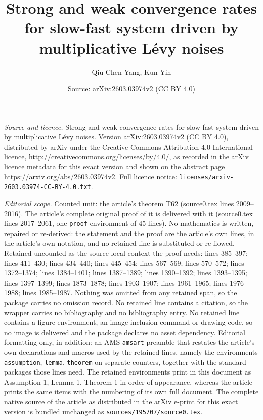 \documentclass[10pt,a4paper]{amsart}
\title{Strong and weak convergence rates for slow-fast system driven by multiplicative L\'{e}vy noises}
\author{Qiu-Chen Yang, Kun Yin}
\date{Source: arXiv:2603.03974v2 (CC BY 4.0)}
\begin{document}
\maketitle

\noindent\emph{Source and licence.} Strong and weak convergence rates for slow-fast system driven by multiplicative L\'{e}vy noises. Version arXiv:2603.03974v2 (CC BY 4.0), distributed by arXiv under the Creative Commons Attribution 4.0 International licence, http://creativecommons.org/licenses/by/4.0/, as recorded in the arXiv licence metadata for this exact version and shown on the abstract page https://arxiv.org/abs/2603.03974v2. Full licence notice: \texttt{licenses/arxiv-2603.03974-CC-BY-4.0.txt}.\par\smallskip

\noindent\textit{Editorial scope.} Counted unit: the article's theorem T62 (source0.tex lines 2009--2016). The article's complete original proof of it is delivered with it (source0.tex lines 2017--2061, one \texttt{proof} environment of 45 lines). No mathematics is written, repaired or re-derived: the statement and the proof are the article's own lines, in the article's own notation, and no retained line is substituted or re-flowed.  Retained uncounted as the source-local context the proof needs: lines 385--397; lines 411--430; lines 434--440; lines 445--454; lines 567--569; lines 570--572; lines 1372--1374; lines 1384--1401; lines 1387--1389; lines 1390--1392; lines 1393--1395; lines 1397--1399; lines 1873--1878; lines 1903--1907; lines 1961--1965; lines 1976--1988; lines 1985--1987.  Nothing was omitted from any retained span, so the package carries no omission record.  No retained line contains a citation, so the wrapper carries no bibliography and no bibliography entry.  No retained line contains a figure environment, an image-inclusion command or drawing code, so no image is delivered and the package declares no asset dependency.  Editorial formatting only, in addition: an AMS \texttt{amsart} preamble that restates the article's own declarations and macros used by the retained lines, namely the environments \texttt{assumption}, \texttt{lemma}, \texttt{theorem} on separate counters, together with the standard packages those lines need.  The retained environments print in this document as Assumption 1, Lemma 1, Theorem 1 in order of appearance, whereas the article prints the same items with the numbering of its own full document.  The complete native source of the article as distributed in the arXiv e-print for this exact version is bundled unchanged as \texttt{sources/195707/source0.tex}.
\end{document}
